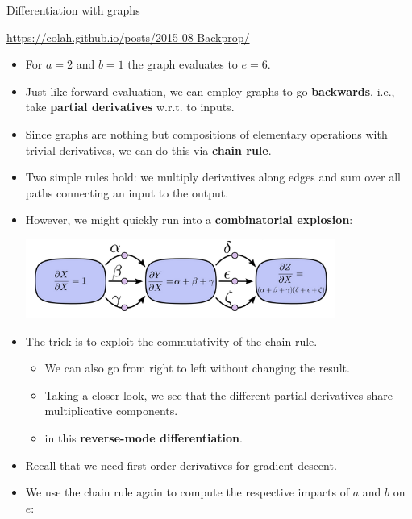 \begin{vbframe}{Differentiation with graphs}
\begin{minipage}[c]{0.4\textwidth}
  \tiny{\url{https://colah.github.io/posts/2015-08-Backprop/}}
\end{minipage}

\begin{itemize} 
  \item For $a = 2$ and $b = 1$ the graph evaluates to $e = 6$.
\end{itemize}

\framebreak
\normalsize

\begin{itemize} 
  \item Just like forward evaluation, we can employ graphs to go 
  \textbf{backwards}, i.e., take \textbf{partial derivatives}
  w.r.t. to inputs.
  \item Since graphs are nothing but compositions of elementary operations 
  with trivial derivatives, we can do this via \textbf{chain rule}.
  \item Two simple rules hold: we multiply derivatives along edges and sum 
  over all paths connecting an input to the output.
  \item However, we might quickly run into a \textbf{combinatorial explosion}:
  
  \includegraphics[width=0.8\textwidth]{figure_man/compgraph_example_3}
  
  \framebreak 
  
  \item The trick is to exploit the commutativity of the chain rule.
  \begin{itemize} 
    \item We can also go from right to left without changing the result.
    \item Taking a closer look, we see that the different partial derivatives 
    share multiplicative components.
    \item in 
    this \textbf{reverse-mode differentiation}.
  \end{itemize}
\end{itemize}


\framebreak

\begin{itemize}
  \footnotesize
  \item Recall that we need first-order derivatives for gradient descent.
  \item We use the chain rule again to compute the respective impacts of $a$ and 
  $b$ on $e$:
\end{itemize}


\end{vbframe}
